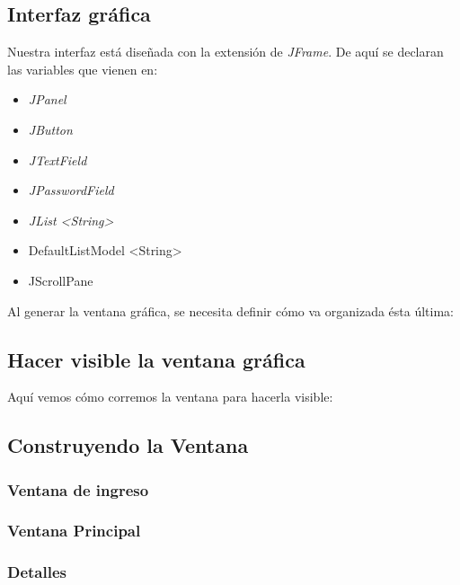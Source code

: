 \documentclass[12pt]{article}
\begin{document}
\subsection{Interfaz gr\'afica}
{Nuestra interfaz est\'a dise\~nada con la extensi\'on de \textit{JFrame}. De aqu\'i se declaran las variables que vienen en:}
\begin{itemize}
\item \textit{JPanel}
\item \textit{JButton}
\item \textit{JTextField}
\item \textit{JPasswordField}
\item \textit{JList \textless{String}\textgreater}
\item DefaultListModel \textless{String}\textgreater
\item JScrollPane
\end{itemize}

{Al generar la ventana gr\'afica, se necesita definir c\'omo va organizada \'esta \'ultima:}\\



\subsection{Hacer visible la ventana gr\'afica}
{Aqu\'i vemos c\'omo corremos la ventana para hacerla visible:}




\subsection{Construyendo la Ventana}
\subsubsection{Ventana de ingreso}



\subsubsection{Ventana Principal}


\subsubsection{Detalles}

\end{document}
